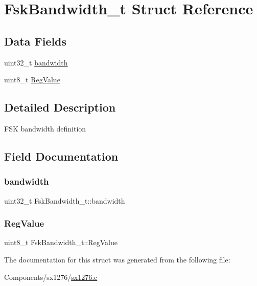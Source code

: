 \hypertarget{structFskBandwidth__t}{}\section{Fsk\+Bandwidth\+\_\+t Struct Reference}
\label{structFskBandwidth__t}
\subsection*{Data Fields}
\begin{DoxyCompactItemize}
\item 
uint32\+\_\+t \hyperlink{structFskBandwidth__t_a717a088404f8ffffb01286095ed8a553}{bandwidth}
\item 
uint8\+\_\+t \hyperlink{structFskBandwidth__t_ac401e2f55f51b74911db229b1644de87}{Reg\+Value}
\end{DoxyCompactItemize}


\subsection{Detailed Description}
F\+SK bandwidth definition 

\subsection{Field Documentation}
\mbox{\label{structFskBandwidth__t_a717a088404f8ffffb01286095ed8a553}} 
\subsubsection{\texorpdfstring{bandwidth}{bandwidth}}
{\footnotesize\ttfamily uint32\+\_\+t Fsk\+Bandwidth\+\_\+t\+::bandwidth}

\mbox{\label{structFskBandwidth__t_ac401e2f55f51b74911db229b1644de87}} 
\subsubsection{\texorpdfstring{Reg\+Value}{RegValue}}
{\footnotesize\ttfamily uint8\+\_\+t Fsk\+Bandwidth\+\_\+t\+::\+Reg\+Value}



The documentation for this struct was generated from the following file\+:\begin{DoxyCompactItemize}
\item 
Components/sx1276/\hyperlink{sx1276_8c}{sx1276.\+c}\end{DoxyCompactItemize}
